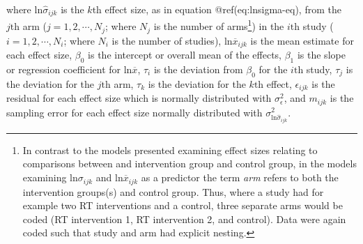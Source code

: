 \documentclass[
]{article}
\begin{document}
where \(\textrm{ln}\hat\sigma_{ijk}\) is the \(k\textrm{th}\) effect size, as in equation @ref(eq:lnsigma-eq), from the \(j\textrm{th}\) arm (\(j = 1,2,\cdots,N_{j}\); where \(N_{j}\) is the number of arms\footnote{In contrast to the models presented examining effect sizes relating to comparisons between and intervention group and control group, in the models examining \(\textrm{ln}\sigma_{ijk}\) and \(\textrm{ln}\overline{x}_{ijk}\) as a predictor the term \emph{arm} refers to both the intervention groups(s) and control group. Thus, where a study had for example two RT interventions and a control, three separate arms would be coded (RT intervention 1, RT intervention 2, and control). Data were again coded such that study and arm had explicit nesting.}) in the \(i\textrm{th}\) study (\(i = 1,2,\cdots,N_{i}\); where \(N_{i}\) is the number of studies), \(\textrm{ln}\overline{x}_{ijk}\) is the mean estimate for each effect size, \(\beta_{0}\) is the intercept or overall mean of the effects, \(\beta_{1}\) is the slope or regression coefficient for \(\textrm{ln}\overline{x}\), \(\tau_{i}\) is the deviation from \(\beta_{0}\) for the \(i\textrm{th}\) study, \(\tau_{j}\) is the deviation for the \(j\textrm{th}\) arm, \(\tau_{k}\) is the deviation for the \(k\textrm{th}\) effect, \(\epsilon_{ijk}\) is the residual for each effect size which is normally distributed with \(\sigma^2_{\epsilon}\), and \(m_{ijk}\) is the sampling error for each effect size normally distributed with \(\sigma^2_{\textrm{ln}\hat\sigma_{ijk}}\).
\end{document}
